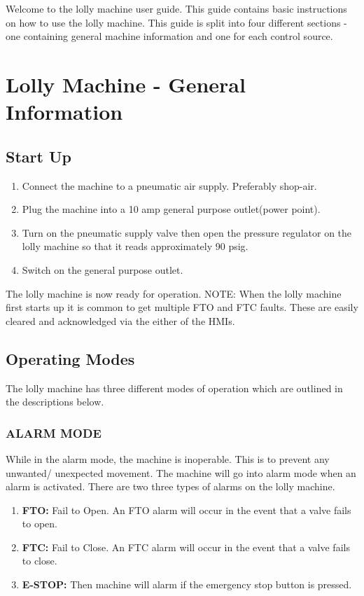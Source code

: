     Welcome to the lolly machine user guide. This guide contains basic instructions on how to use the lolly machine. This guide is split into four different sections - one containing general machine information and one for each control source. 


\section{Lolly Machine - General Information}

    \subsection{Start Up}
        \begin{enumerate}
            \item Connect the machine to a pneumatic air supply. Preferably shop-air. 
            \item Plug the machine into a  10 amp general purpose outlet(power point).
            \item Turn on the pneumatic supply valve then open the pressure regulator on the lolly machine so that it reads approximately 90 psig.
            \item Switch on the general purpose outlet.
        \end{enumerate}
        
        The lolly machine is now ready for operation. \newline
        NOTE: When the lolly machine first starts up it is common to get multiple FTO and FTC faults. These are easily cleared and acknowledged via the either of the HMIs.
        
 

    \subsection{Operating Modes}
        The lolly machine has three different modes of operation which are outlined in the descriptions below.

            \subsubsection{ALARM MODE} While in the alarm mode, the machine is inoperable. This is to prevent any unwanted/ unexpected movement. The machine will go into alarm mode when an alarm is activated. There are two three types of alarms on the lolly machine.
            \begin{enumerate}
                \item\textbf{FTO:} Fail to Open. An FTO alarm will occur in the event that a valve fails to open.
                \item\textbf{FTC:} Fail to Close. An FTC alarm will occur in the event that a valve fails to close.
                \item\textbf{E-STOP:} Then machine will alarm if the emergency stop button is pressed.
            \end{enumerate}
            
